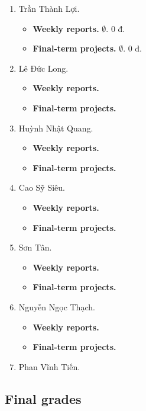 \documentclass{article}
\begin{document}
\begin{enumerate}
\begin{itemize}
\begin{itemize}
        \end{itemize}
    \end{itemize}
    \item {\sc Trần Thành Lợi.}
    \begin{itemize}
        \item {\bf Weekly reports.} $\emptyset$. 0 đ.
        \item {\bf Final-term projects.} $\emptyset$. 0 đ.
    \end{itemize}
    \item {\sc Lê Đức Long.}
    \begin{itemize}
        \item {\bf Weekly reports.}
        \item {\bf Final-term projects.}
    \end{itemize}
    \item {\sc Huỳnh Nhật Quang.}
    \begin{itemize}
        \item {\bf Weekly reports.}
        \item {\bf Final-term projects.}
    \end{itemize}
    \item {\sc Cao Sỹ Siêu.}
    \begin{itemize}
        \item {\bf Weekly reports.}
        \item {\bf Final-term projects.}
    \end{itemize}
    \item {\sc Sơn Tân.}
    \begin{itemize}
        \item {\bf Weekly reports.}
        \item {\bf Final-term projects.}
    \end{itemize}
    \item {\sc Nguyễn Ngọc Thạch.}
    \begin{itemize}
        \item {\bf Weekly reports.}
        \item {\bf Final-term projects.}
    \end{itemize}
    \item {\sc Phan Vĩnh Tiến.}
\end{enumerate}


\subsection{Final grades}
\end{document}
